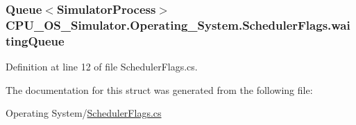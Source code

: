 \subsubsection[{waiting\+Queue}]{\setlength{\rightskip}{0pt plus 5cm}Queue$<${\bf Simulator\+Process}$>$ C\+P\+U\+\_\+\+O\+S\+\_\+\+Simulator.\+Operating\+\_\+\+System.\+Scheduler\+Flags.\+waiting\+Queue}\label{struct_c_p_u___o_s___simulator_1_1_operating___system_1_1_scheduler_flags_acd01af6379302599c522a0331a6276fc}


Definition at line 12 of file Scheduler\+Flags.\+cs.



The documentation for this struct was generated from the following file\+:\begin{DoxyCompactItemize}
\item 
Operating System/\hyperlink{_scheduler_flags_8cs}{Scheduler\+Flags.\+cs}\end{DoxyCompactItemize}
